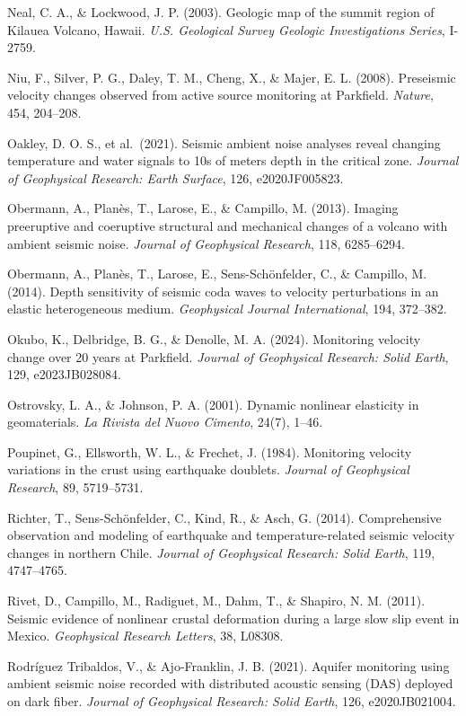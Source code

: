 \documentclass[12pt]{article}
\begin{document}
Neal, C. A., \& Lockwood, J. P. (2003). Geologic map of the summit
region of Kilauea Volcano, Hawaii. \emph{U.S. Geological Survey Geologic
Investigations Series}, I-2759.

Niu, F., Silver, P. G., Daley, T. M., Cheng, X., \& Majer, E. L. (2008).
Preseismic velocity changes observed from active source monitoring at
Parkfield. \emph{Nature}, 454, 204--208.

Oakley, D. O. S., et al.~(2021). Seismic ambient noise analyses reveal
changing temperature and water signals to 10s of meters depth in the
critical zone. \emph{Journal of Geophysical Research: Earth Surface},
126, e2020JF005823.

Obermann, A., Planès, T., Larose, E., \& Campillo, M. (2013). Imaging
preeruptive and coeruptive structural and mechanical changes of a
volcano with ambient seismic noise. \emph{Journal of Geophysical
Research}, 118, 6285--6294.

Obermann, A., Planès, T., Larose, E., Sens-Schönfelder, C., \& Campillo,
M. (2014). Depth sensitivity of seismic coda waves to velocity
perturbations in an elastic heterogeneous medium. \emph{Geophysical
Journal International}, 194, 372--382.

Okubo, K., Delbridge, B. G., \& Denolle, M. A. (2024). Monitoring
velocity change over 20 years at Parkfield. \emph{Journal of Geophysical
Research: Solid Earth}, 129, e2023JB028084.

Ostrovsky, L. A., \& Johnson, P. A. (2001). Dynamic nonlinear elasticity
in geomaterials. \emph{La Rivista del Nuovo Cimento}, 24(7), 1--46.

Poupinet, G., Ellsworth, W. L., \& Frechet, J. (1984). Monitoring
velocity variations in the crust using earthquake doublets.
\emph{Journal of Geophysical Research}, 89, 5719--5731.

Richter, T., Sens-Schönfelder, C., Kind, R., \& Asch, G. (2014).
Comprehensive observation and modeling of earthquake and
temperature-related seismic velocity changes in northern Chile.
\emph{Journal of Geophysical Research: Solid Earth}, 119, 4747--4765.

Rivet, D., Campillo, M., Radiguet, M., Dahm, T., \& Shapiro, N. M.
(2011). Seismic evidence of nonlinear crustal deformation during a large
slow slip event in Mexico. \emph{Geophysical Research Letters}, 38,
L08308.

Rodríguez Tribaldos, V., \& Ajo-Franklin, J. B. (2021). Aquifer
monitoring using ambient seismic noise recorded with distributed
acoustic sensing (DAS) deployed on dark fiber. \emph{Journal of
Geophysical Research: Solid Earth}, 126, e2020JB021004.
\end{document}
